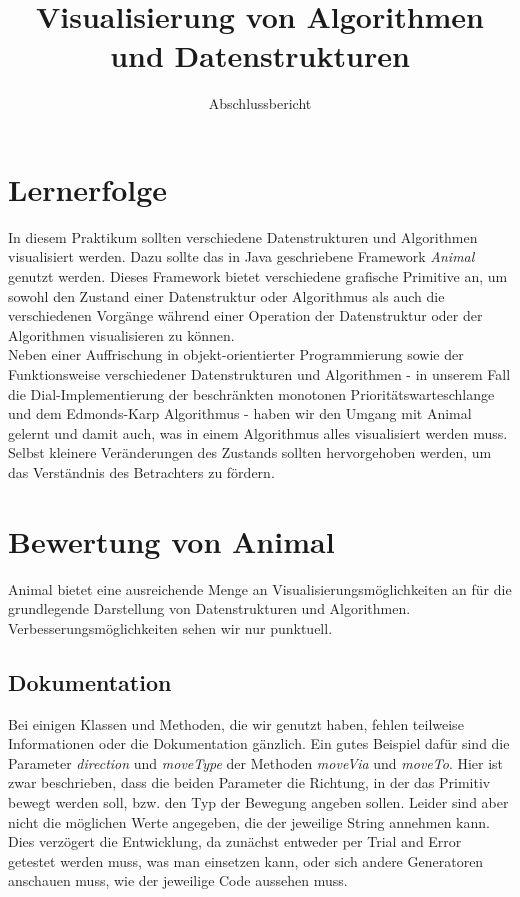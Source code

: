 \documentclass[solution]{tudreport}
\title{Visualisierung von Algorithmen und Datenstrukturen}
\subtitle{Abschlussbericht}
\begin{document}
	\lstset{language=Java}
	\maketitle
	
	\chapter{Lernerfolge}
		In diesem Praktikum sollten verschiedene Datenstrukturen und Algorithmen visualisiert werden. Dazu sollte das in Java geschriebene Framework \textit{Animal} genutzt werden. Dieses Framework bietet verschiedene grafische Primitive an, um sowohl den Zustand einer Datenstruktur oder Algorithmus als auch die verschiedenen Vorgänge während einer Operation der Datenstruktur oder der Algorithmen visualisieren zu können.\\
		Neben einer Auffrischung in objekt-orientierter Programmierung sowie der Funktionsweise verschiedener Datenstrukturen und Algorithmen - in unserem Fall die Dial-Implementierung der beschränkten monotonen Prioritätswarteschlange und dem Edmonds-Karp Algorithmus - haben wir den Umgang mit Animal gelernt und damit auch, was in einem Algorithmus alles visualisiert werden muss. Selbst kleinere Veränderungen des Zustands sollten hervorgehoben werden, um das Verständnis des Betrachters zu fördern.
		
	\chapter{Bewertung von Animal}
		Animal bietet eine ausreichende Menge an Visualisierungsmöglichkeiten an für die grundlegende Darstellung von Datenstrukturen und Algorithmen. Verbesserungsmöglichkeiten sehen wir nur punktuell.
		\section{Dokumentation}
			Bei einigen Klassen und Methoden, die wir genutzt haben, fehlen teilweise Informationen oder die Dokumentation gänzlich. Ein gutes Beispiel dafür sind die Parameter \textit{direction} und \textit{moveType} der Methoden \textit{moveVia} und \textit{moveTo}. Hier ist zwar beschrieben, dass die beiden Parameter die Richtung, in der das Primitiv bewegt werden soll, bzw. den Typ der Bewegung angeben sollen. Leider sind aber nicht die möglichen Werte angegeben, die der jeweilige String annehmen kann. Dies verzögert die Entwicklung, da zunächst entweder per Trial and Error getestet werden muss, was man einsetzen kann, oder sich andere Generatoren anschauen muss, wie der jeweilige Code aussehen muss.
		
\end{document}
